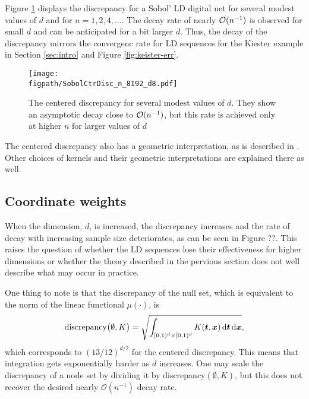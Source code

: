 \documentclass{svproc}
\newcommand{\figpath}{Figures}
\begin{document}
Figure \ref{fig:ctrdiscmodestd} displays the discrepancy for a Sobol' LD digital net for several modest values of $d$ and for $n =  1, 2, 4, \ldots$.  The decay rate of nearly ${\mathcal{O}}(n^{-1})$ is observed for small $d$ and can be anticipated for a bit larger $d$.  Thus, the decay of the discrepancy mirrors the convergenc rate for LD sequences for the Kiester example in Section \ref{sec:intro} and Figure \ref{fig:keister-err}.

\begin{figure}
	\centering
	\texttt{[image: \\figpath/SobolCtrDisc\_n\_8192\_d8.pdf]}
	\caption{The centered discrepancy for several modest values of $d$.  They show an asymptotic decay close to ${\mathcal{O}}(n^{-1})$, but this rate is achieved only at higher $n$ for larger values of $d$ \label{fig:ctrdiscmodestd}}
\end{figure}

The centered discrepancy also has a geometric interpretation, as is described in \cite{Hic97a}. Other choices of kernels and their geometric interpretations are explained there as well.


\subsection{Coordinate weights} \label{sec:coordwts}
When the dimension, $d$, is increased, the discrepancy increases and the rate of decay with increasing sample size deteriorates, as can be seen in Figure ??.  This raises the question of whether the LD sequences lose their effectiveness for higher dimensions or whether the theory described in the pervious section does not well describe what may occur in practice.

One thing to note is that the discrepancy of the null set, which is equivalent to the norm of the linear functional $\mu(\cdot)$, is
\begin{equation}
		\text{discrepancy}\bigl(\emptyset,K \bigr)  = \sqrt{\int_{[0,1)^d \times [0,1)^d} K({\boldsymbol{t}},{\boldsymbol{x}}) \, \mathrm{d} {\boldsymbol{t}} \, \mathrm{d} {\boldsymbol{x}}},
\end{equation}
which corresponds to $(13/12)^{d/2}$ for the centered discrepancy.  This means that integration gets exponentially harder as $d$ increases.  One may scale the discrepancy of a node set by dividing it by discrepancy$(\emptyset,K)$, but this does not recover the desired nearly $\mathcal{O}(n^{-1})$ decay rate.
\end{document}

